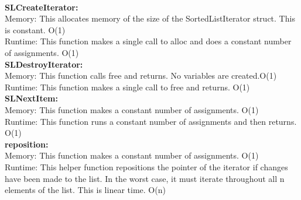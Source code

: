 \documentclass[10pt]{article}
\begin{document}
\\
\textbf{SLCreateIterator:}\\
Memory: This allocates memory of the size of the SortedListIterator struct. This is constant. O(1)\\
Runtime: This function makes a single call to alloc and does a constant number of assignments. O(1)
\\
\textbf{SLDestroyIterator:}\\
Memory: This function calls free and returns. No variables are created.O(1)\\
Runtime: This function makes a single call to free and returns. O(1)
\\
\textbf{SLNextItem:}\\
Memory: This function makes a constant number of assignments. O(1)\\
Runtime: This function runs a constant number of assignments and then returns. O(1)
\\
\textbf{reposition:}\\
Memory: This function makes a constant number of assignments. O(1)\\
Runtime: This helper function repositions the pointer of the iterator if changes have been made to the list. In the worst case, it must iterate throughout all n elements of the list. This is linear time. O(n)
\end{document}
